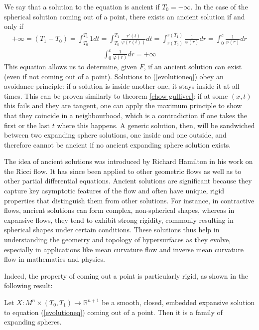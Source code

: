 We say that a solution to the equation is ancient if $T_0=-\infty$. 
In the case of the spherical solution coming out of a point, there exists an ancient solution if and only if
\begin{align*}
	+\infty=(T_1-T_0)=\int_{T_0}^{T_1} 1 dt = \int_{T_0}^{T_1}\frac{r'(t)}{\varphi(r(t))} dt = \int_{r(T_0)}^{r(T_1)}\frac{1}{\varphi(r)} dr = \int_{0}^{c}\frac{1}{\varphi(r)} dr
\end{align*}
\begin{align*}
	\int_{0}^{c}\frac{1}{\varphi(r)} dr =+\infty
\end{align*}
This equation allows us to determine, given $F$, if an ancient solution can exist (even if not coming out of a point). Solutions to (\ref{evolutioneq}) obey an avoidance principle: if a solution is inside another one, it stays inside it at all times. This can be proven similarly to theorem \ref{chow gulliver}: if at some $(x, t)$ this fails and they are tangent, one can apply the maximum principle to show that they coincide in a neighbourhood, which is a contradiction if one takes the first or the last $t$ where this happens. A generic solution, then, will be sandwiched between two expanding sphere solutions, one inside and one outside, and therefore cannot be ancient if no ancient expanding sphere solution exists. 


The idea of ancient solutions was introduced by Richard Hamilton in his work on the Ricci flow. It has since been applied to other geometric flows as well as to other partial differential equations. Ancient solutions are significant because they capture key asymptotic features of the flow and often have unique, rigid properties that distinguish them from other solutions. For instance, in contractive flows, ancient solutions can form complex, non-spherical shapes, whereas in expansive flows, they tend to exhibit strong rigidity, commonly resulting in spherical shapes under certain conditions. These solutions thus help in understanding the geometry and topology of hypersurfaces as they evolve, especially in applications like mean curvature flow and inverse mean curvature flow in mathematics and physics.


Indeed, the property of coming out a point is particularly rigid, as shown in the following result:

\begin{theorem}
	Let $ X : M^n \times (T_0, T_1) \to \mathbb{R}^{n+1} $ be a smooth, closed, embedded expansive solution to equation (\ref{evolutioneq}) coming out of a point. Then it is a family of expanding spheres.\label{pointexpanding}
\end{theorem}

